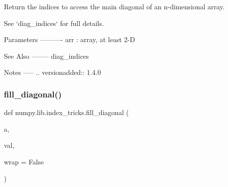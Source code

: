 \begin{DoxyVerb}Return the indices to access the main diagonal of an n-dimensional array.

See `diag_indices` for full details.

Parameters
----------
arr : array, at least 2-D

See Also
--------
diag_indices

Notes
-----
.. versionadded:: 1.4.0\end{DoxyVerb}
 \mbox{\label{namespacenumpy_1_1lib_1_1index__tricks_a63f9e685bbece785aff8007562d962fb}} 
\subsubsection{\texorpdfstring{fill\+\_\+diagonal()}{fill\_diagonal()}}
{\footnotesize\ttfamily def numpy.\+lib.\+index\+\_\+tricks.\+fill\+\_\+diagonal (\begin{DoxyParamCaption}\item[{}]{a,  }\item[{}]{val,  }\item[{}]{wrap = {\ttfamily False} }\end{DoxyParamCaption})}

